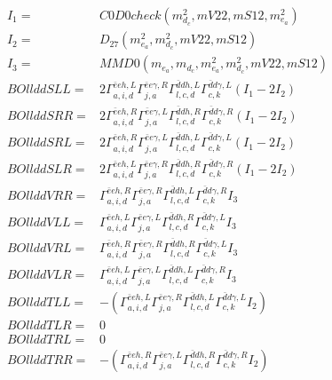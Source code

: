 \documentclass[A4,landscape]{article}
\begin{document}
\begin{align} 
I_1 = & C0D0check(m^2_{d_{{c}}}, mV22, mS12, m^2_{e_{{a}}}) \\ 
I_2 = & D_{27}(m^2_{e_{{a}}}, m^2_{d_{{c}}}, mV22, mS12) \\ 
I_3 = & MMD0(m_{e_{{a}}}, m_{d_{{c}}}, m^2_{e_{{a}}}, m^2_{d_{{c}}}, mV22, mS12) \\ 
  BOllddSLL= & 2  \Gamma^{\bar{e}e h ,L}_{a, i, d} \Gamma^{\bar{e}e \gamma ,R}_{j, a} \Gamma^{\bar{d}d h ,L}_{l, c, d} \Gamma^{\bar{d}d \gamma ,L}_{c, k} (I_1 - 2 I_2) \\ 
  BOllddSRR= & 2  \Gamma^{\bar{e}e h ,R}_{a, i, d} \Gamma^{\bar{e}e \gamma ,L}_{j, a} \Gamma^{\bar{d}d h ,R}_{l, c, d} \Gamma^{\bar{d}d \gamma ,R}_{c, k} (I_1 - 2 I_2) \\ 
  BOllddSRL= & 2  \Gamma^{\bar{e}e h ,R}_{a, i, d} \Gamma^{\bar{e}e \gamma ,L}_{j, a} \Gamma^{\bar{d}d h ,L}_{l, c, d} \Gamma^{\bar{d}d \gamma ,L}_{c, k} (I_1 - 2 I_2) \\ 
  BOllddSLR= & 2  \Gamma^{\bar{e}e h ,L}_{a, i, d} \Gamma^{\bar{e}e \gamma ,R}_{j, a} \Gamma^{\bar{d}d h ,R}_{l, c, d} \Gamma^{\bar{d}d \gamma ,R}_{c, k} (I_1 - 2 I_2) \\ 
  BOllddVRR= &  \Gamma^{\bar{e}e h ,R}_{a, i, d} \Gamma^{\bar{e}e \gamma ,R}_{j, a} \Gamma^{\bar{d}d h ,L}_{l, c, d} \Gamma^{\bar{d}d \gamma ,R}_{c, k} I_3 \\ 
  BOllddVLL= &  \Gamma^{\bar{e}e h ,L}_{a, i, d} \Gamma^{\bar{e}e \gamma ,L}_{j, a} \Gamma^{\bar{d}d h ,R}_{l, c, d} \Gamma^{\bar{d}d \gamma ,L}_{c, k} I_3 \\ 
  BOllddVRL= &  \Gamma^{\bar{e}e h ,R}_{a, i, d} \Gamma^{\bar{e}e \gamma ,R}_{j, a} \Gamma^{\bar{d}d h ,R}_{l, c, d} \Gamma^{\bar{d}d \gamma ,L}_{c, k} I_3 \\ 
  BOllddVLR= &  \Gamma^{\bar{e}e h ,L}_{a, i, d} \Gamma^{\bar{e}e \gamma ,L}_{j, a} \Gamma^{\bar{d}d h ,L}_{l, c, d} \Gamma^{\bar{d}d \gamma ,R}_{c, k} I_3 \\ 
  BOllddTLL= & -( \Gamma^{\bar{e}e h ,L}_{a, i, d} \Gamma^{\bar{e}e \gamma ,R}_{j, a} \Gamma^{\bar{d}d h ,L}_{l, c, d} \Gamma^{\bar{d}d \gamma ,L}_{c, k} I_2) \\ 
  BOllddTLR= & 0 \\ 
  BOllddTRL= & 0 \\ 
  BOllddTRR= & -( \Gamma^{\bar{e}e h ,R}_{a, i, d} \Gamma^{\bar{e}e \gamma ,L}_{j, a} \Gamma^{\bar{d}d h ,R}_{l, c, d} \Gamma^{\bar{d}d \gamma ,R}_{c, k} I_2) \\ 
\end{align} 
\end{document}
